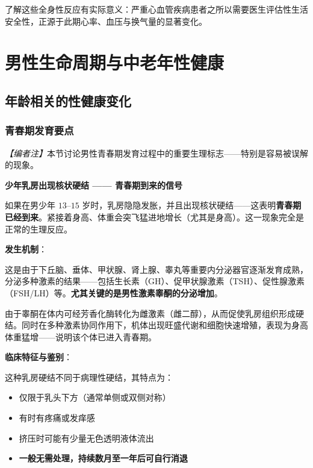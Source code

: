 \documentclass[12pt,a4paper,twoside]{ctexbook}
\begin{document}
了解这些全身性反应有实际意义：严重心血管疾病患者之所以需要医生评估性生活安全性，正源于此期心率、血压与换气量的显著变化。


\chapter{男性生命周期与中老年性健康}

\section{年龄相关的性健康变化}


\subsection{青春期发育要点}

\noindent\textit{【编者注】}本节讨论男性青春期发育过程中的重要生理标志——特别是容易被误解的现象。

\vspace{0.5em}
\noindent\textbf{少年乳房出现核状硬结 —— 青春期到来的信号}

如果在男少年 $13$--$15$ 岁时，乳房隐隐发胀，并且出现核状硬结——这表明\textbf{青春期已经到来}。紧接着身高、体重会突飞猛进地增长（尤其是身高）。这一现象完全是正常的生理反应。

\vspace{0.5em}
\noindent\textbf{发生机制}：

这是由于下丘脑、垂体、甲状腺、肾上腺、睾丸等重要内分泌器官逐渐发育成熟，分泌多种激素的结果——包括生长素（GH）、促甲状腺激素（TSH）、促性腺激素（FSH/LH）等。\textbf{尤其关键的是男性激素睾酮的分泌增加}。

由于睾酮在体内可经芳香化酶转化为雌激素（雌二醇），从而促使乳房组织形成硬结。同时在多种激素协同作用下，机体出现旺盛代谢和细胞快速增殖，表现为身高体重猛增——说明该个体已进入青春期。

\vspace{0.5em}
\noindent\textbf{临床特征与鉴别}：

这种乳房硬结不同于病理性硬结，其特点为：
\begin{itemize}
	\item 仅限于乳头下方（通常单侧或双侧对称）
	\item 有时有疼痛或发痒感
	\item 挤压时可能有少量无色透明液体流出
	\item \textbf{一般无需处理，持续数月至一年后可自行消退}
\end{itemize}
\end{document}
